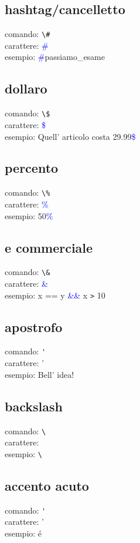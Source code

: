 \documentclass{report}
\begin{document}
        \subsection{hashtag/cancelletto}
            comando: \verb!\#! \\
            carattere: \textcolor{blue}{\#} \\
            esempio: \textcolor{blue}{\#}passiamo\_esame
        \subsection{dollaro}
            comando: \verb!\$! \\
            carattere: \textcolor{blue}{\$} \\
            esempio: Quell' articolo costa 29.99\textcolor{blue}{\$} 
        \subsection{percento}
            comando: \verb!\%! \\
            carattere: \textcolor{blue}{\%} \\
            esempio: 50\textcolor{blue}{\%}
        \subsection{e commerciale}
            comando: \verb!\&! \\
            carattere: \textcolor{blue}{\&} \\
            esempio: x == y \textcolor{blue}{\&\&} x \verb!>! 10
        \subsection{apostrofo}
            comando: \verb!'! \\
            carattere: \textcolor{blue}{'} \\
            esempio: Bell\textcolor{blue}{'} idea!
        \subsection{backslash}
            comando: \verb!\! \\
            carattere: \textcolor{blue}{} \\
            esempio: \verb!\!
        \subsection{accento acuto} 
            comando: \verb!'! \\
            carattere: \textcolor{blue}{'} \\
            esempio: \'{e}
\end{document}

